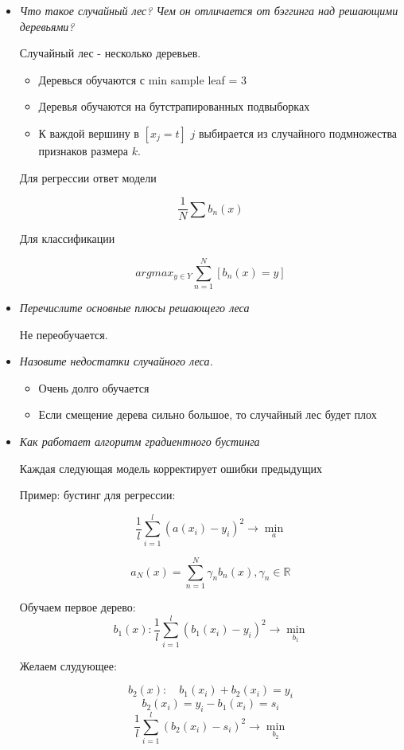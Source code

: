 \documentclass[12pt]{article}
\begin{document}
\begin{itemize}
\item \textit{Что такое случайный лес? Чем он отличается от бэггинга над решающими
деревьями?}

Случайный лес - несколько деревьев.

\begin{itemize}
\item Деревься обучаются с min sample leaf = 3
\item Деревья обучаются на бутстрапированных подвыборках
\item К важдой вершину в $[x_j = t]$ $j$ выбирается из случайного подмножества признаков размера $k$.
\end{itemize}

Для регрессии ответ модели 

\[ \frac{1}{N} \sum b_n(x) \]

Для классификации

\[ argmax_{y \in Y} \sum_{n=1}^N [b_n(x) = y] \]

\item \textit{Перечислите основные плюсы решающего леса}

Не переобучается.

\item \textit{Назовите недостатки случайного леса.}

\begin{itemize}
\item Очень долго обучается
\item Если смещение дерева сильно большое, то случайный лес будет плох
\end{itemize}

\item \textit{Как работает алгоритм градиентного бустинга}

Каждая следующая модель корректирует ошибки предыдущих

Пример: бустинг для регрессии:

\[ \frac{1}{l} \sum_{i=1}^l (a(x_i) - y_i)^2 \rightarrow \min_a \]

\[a_N(x) = \sum_{n=1}^N \gamma_n b_n(x), \gamma_n \in \mathbb{R} \]

Обучаем первое дерево:
\[ b_1(x): \frac{1}{l} \sum_{i=1}^l (b_1(x_i)-y_i)^2 \rightarrow \min_{b_1} \]

Желаем слудующее:

\[ b_2(x): \quad b_1(x_i) + b_2(x_i) = y_i \]
\[ b_2(x_i) = y_i - b_1(x_i) = s_i \]
\[ \frac{1}{l} \sum_{i=1}^l (b_2(x_i)-s_i)^2 \rightarrow \min_{b_2} \]


\end{itemize}
\end{document}
